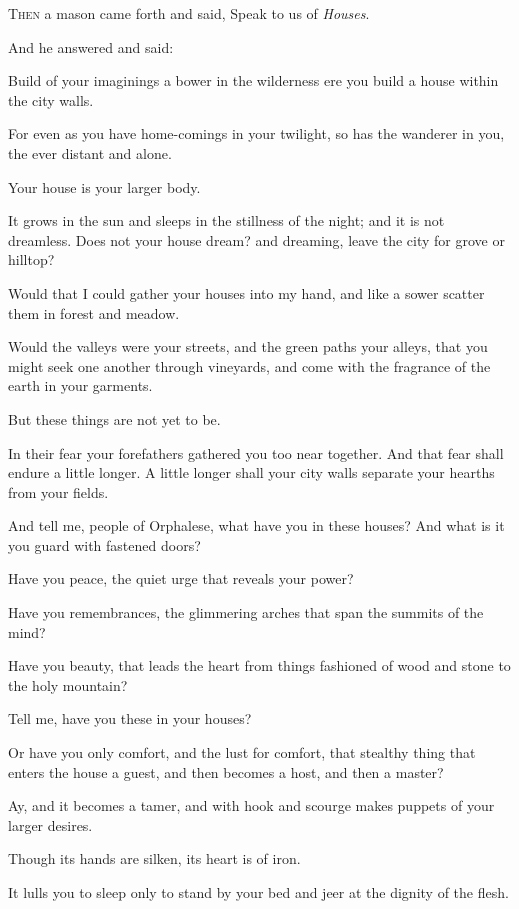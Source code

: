 \lettrine{T}{hen} a mason came forth and said,
Speak to us of \textit{Houses}.

\medskip
And he answered and said:

Build of your imaginings a bower in the
wilderness ere you build a house within
the city walls.

For even as you have home-comings in
your twilight, so has the wanderer in
you, the ever distant and alone.

Your house is your larger body.

It grows in the sun and sleeps in the
stillness of the night; and it is not
dreamless. Does not your house dream?
and dreaming, leave the city for grove
or hilltop?

Would that I could gather your houses
into my hand, and like a sower scatter
them in forest and meadow.

Would the valleys were your streets, and
the green paths your alleys, that you
might seek one another through
vineyards, and come with the fragrance
of the earth in your garments.

But these things are not yet to be.

In their fear your forefathers gathered
you too near together. And that fear
shall endure a little longer. A little
longer shall your city walls separate
your hearths from your fields.



And tell me, people of Orphalese, what
have you in these houses? And what is it
you guard with fastened doors?

Have you peace, the quiet urge that
reveals your power?

Have you remembrances, the glimmering
arches that span the summits of the
mind?

Have you beauty, that leads the heart
from things fashioned of wood and stone
to the holy mountain?

Tell me, have you these in your houses?

Or have you only comfort, and the lust
for comfort, that stealthy thing that
enters the house a guest, and then
becomes a host, and then a master?



Ay, and it becomes a tamer, and with
hook and scourge makes puppets of your
larger desires.

Though its hands are silken, its heart
is of iron.

It lulls you to sleep only to stand by
your bed and jeer at the dignity of the
flesh.

